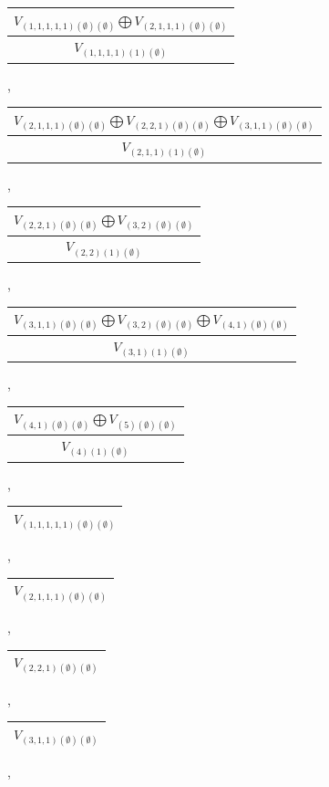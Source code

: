 \documentclass[letterpaper,11pt]{article}
\begin{document}
	\begin{tabular}{| c |}
		\hline
		$V_{(1,1,1,1,1)(\emptyset)(\emptyset)}$$\bigoplus$$V_{(2,1,1,1)(\emptyset)(\emptyset)}$\\
		\hline
		$V_{(1,1,1,1)(1)(\emptyset)}$\\
		\hline
	\end{tabular}, 
	\newline 
	\begin{tabular}{| c |}
		\hline
		$V_{(2,1,1,1)(\emptyset)(\emptyset)}$$\bigoplus$$V_{(2,2,1)(\emptyset)(\emptyset)}$$\bigoplus$$V_{(3,1,1)(\emptyset)(\emptyset)}$\\
		\hline
		$V_{(2,1,1)(1)(\emptyset)}$\\
		\hline
	\end{tabular}, 
	\begin{tabular}{| c |}
		\hline
		$V_{(2,2,1)(\emptyset)(\emptyset)}$$\bigoplus$$V_{(3,2)(\emptyset)(\emptyset)}$\\
		\hline
		$V_{(2,2)(1)(\emptyset)}$\\
		\hline
	\end{tabular}, 
	\newline 
	\begin{tabular}{| c |}
		\hline
		$V_{(3,1,1)(\emptyset)(\emptyset)}$$\bigoplus$$V_{(3,2)(\emptyset)(\emptyset)}$$\bigoplus$$V_{(4,1)(\emptyset)(\emptyset)}$\\
		\hline
		$V_{(3,1)(1)(\emptyset)}$\\
		\hline
	\end{tabular}, 
	\begin{tabular}{| c |}
		\hline
		$V_{(4,1)(\emptyset)(\emptyset)}$$\bigoplus$$V_{(5)(\emptyset)(\emptyset)}$\\
		\hline
		$V_{(4)(1)(\emptyset)}$\\
		\hline
	\end{tabular}, 
	\begin{tabular}{| c |}
		\hline
		$V_{(1,1,1,1,1)(\emptyset)(\emptyset)}$\\
		\hline
	\end{tabular}, 
	\begin{tabular}{| c |}
		\hline
		$V_{(2,1,1,1)(\emptyset)(\emptyset)}$\\
		\hline
	\end{tabular}, 
	\begin{tabular}{| c |}
		\hline
		$V_{(2,2,1)(\emptyset)(\emptyset)}$\\
		\hline
	\end{tabular}, 
	\begin{tabular}{| c |}
		\hline
		$V_{(3,1,1)(\emptyset)(\emptyset)}$\\
		\hline
	\end{tabular}, 
\end{document}
